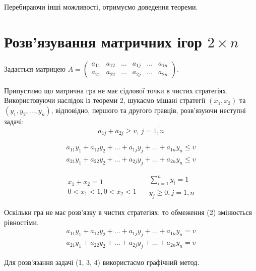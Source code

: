 \documentclass[12pt,a4paper]{book}
\begin{document}
Перебираючи інші можливості, отримуємо доведення теореми.

\section{Розв’язування матричних ігор $2 \times n$}

Задається матрицею $A=\left ( \begin{array}{cccccc}
a_{11}&a_{12}&\dots&a_{1j}&\dots&a_{1n}\\
a_{21}&a_{22}&\dots&a_{2j}&\dots&a_{2n}
\end{array}\right)$.

Припустимо що матрична гра не має сідлової точки в чистих стратегіях. Використовуючи наслідок із теореми 2, шукаємо мішані стратегії $(x_1, x_2)$ та $(y_1,y_2,\dots,y_n)$, відповідно, першого та другого гравців, розв'язуючи неступні задачі:
\begin{equation}
a_{1j}+a_{2j} \ge v, \, j=\overline{1,n}
\end{equation}

\begin{equation}
\begin{array}{l}
a_{11}y_1+a_{12}y_2+\dots+a_{1j}y_j+\dots+a_{1n}y_n \le v\\
a_{21}y_1+a_{22}y_2+\dots+a_{2j}y_j+\dots+a_{2n}y_n \le v
\end{array}
\end{equation}

\begin{equation}
\begin{array}{c}
x_1+x_2=1\\
0<x_1<1, 0<x_2<1
\end{array}
\quad
\begin{array}{c}
\sum_{i=1}^n y_i=1\\
y_j \ge 0, j=\overline{1,n}
\end{array}
\end{equation}

Оскільки гра не має розв'язку в чистих стратегіях, то обмеження (2) змінюється рівностіми.
\begin{equation}
\begin{array}{l}
a_{11}y_1+a_{12}y_2+\dots+a_{1j}y_j+\dots+a_{1n}y_n = v\\
a_{21}y_1+a_{22}y_2+\dots+a_{2j}y_j+\dots+a_{2n}y_n = v
\end{array}
\end{equation}

Для розв'язання задачі (1, 3, 4) використаємо графічний метод.
\end{document}
